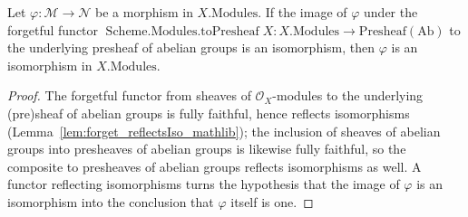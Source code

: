 \begin{lemma}

  \label{lem:isIso_modules_of_toPresheaf}
  Let \(\varphi : \mathcal{M} \to \mathcal{N}\) be a morphism in \(X.\mathrm{Modules}\). If the
  image of \(\varphi\) under the forgetful functor
  \(\operatorname{Scheme.Modules.toPresheaf} X : X.\mathrm{Modules} \to \mathrm{Presheaf}(\mathrm{Ab})\)
  to the underlying presheaf of abelian groups is an isomorphism, then \(\varphi\) is an
  isomorphism in \(X.\mathrm{Modules}\).
\end{lemma}
\begin{proof}
  \leanok
  The forgetful functor from sheaves of \(\mathcal{O}_X\)-modules to the underlying (pre)sheaf of
  abelian groups is fully faithful, hence reflects isomorphisms
  (Lemma~\ref{lem:forget_reflectsIso_mathlib}); the inclusion of sheaves of abelian groups into
  presheaves of abelian groups is likewise fully faithful, so the composite to presheaves of abelian
  groups reflects isomorphisms as well. A functor reflecting isomorphisms turns the hypothesis that
  the image of \(\varphi\) is an isomorphism into the conclusion that \(\varphi\) itself is one.
\end{proof}

